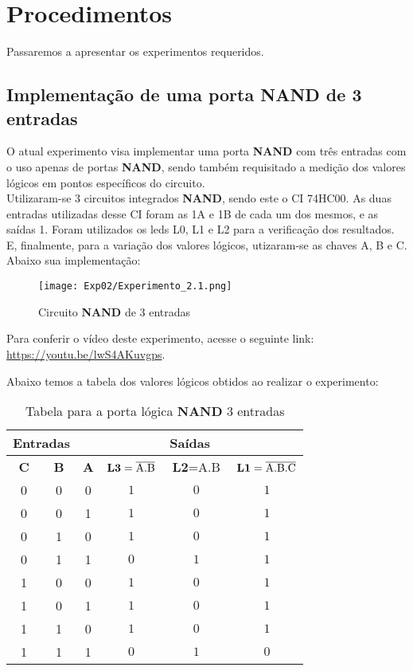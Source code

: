 \documentclass[12pt]{article}
\begin{document}
\section{Procedimentos}
\label{sec:Procedimentos}

Passaremos a apresentar os experimentos requeridos.

\subsection{Implementação de uma porta \textbf{NAND} de 3 entradas}
\label{sec:led_chave}

O atual experimento visa implementar uma porta \textbf{NAND} com três entradas com o uso apenas de portas \textbf{NAND}, sendo também requisitado a medição dos valores lógicos em pontos específicos do circuito.\\
Utilizaram-se 3 circuitos integrados \textbf{NAND}, sendo este o CI 74HC00. As duas entradas utilizadas desse CI foram as 1A e 1B de cada um dos mesmos, e as saídas 1. Foram utilizados os leds L0, L1 e L2 para a verificação dos resultados. E, finalmente, para a variação dos valores lógicos, utizaram-se as chaves A, B e C.\\

Abaixo sua implementação:
\begin{figure}[H]
    \centering
    \texttt{[image: Exp02/Experimento\_2.1.png]}
    \caption{Circuito \textbf{NAND} de 3 entradas}
    \label{fig:Esquema_Experimento2_2.3}
\end{figure}

Para conferir o vídeo deste experimento, acesse o seguinte link:
\href{https://youtu.be/lwS4AKuvgps}{https://youtu.be/lwS4AKuvgps}.

Abaixo temos a tabela dos valores lógicos obtidos ao realizar o experimento:

\begin{table}[H]
    \centering
    \caption{Tabela para a porta lógica \textbf{NAND} 3 entradas}
    \begin{tabular}{|c|c|c|c|c|c|}
     \hline
    \multicolumn{2}{|c|}{Entradas} & \multicolumn{4}{|c|}{Saídas} \\
    \hline
    \textbf{C} & \textbf{B} & \textbf{A} & $\textbf{L3}=\overline{\rm A.B}$ & $\textbf{L2}=\text{A.B}$ & $\textbf{L1}=\overline{\rm A.B.C}$ \\
    \hline
    0 & 0  & 0 & \(1\) & \(0\) & \(1\) \\
    \hline
    0 & 0  & 1 & \(1\) & \(0\) & \(1\) \\
    \hline
    0 & 1  & 0 & \(1\) & \(0\) & \(1\) \\
    \hline
    0 & 1  & 1 & \(0\) & \(1\) & \(1\) \\
    \hline
    1 & 0  & 0 & \(1\) & \(0\) & \(1\) \\
    \hline
    1 & 0  & 1 & \(1\) & \(0\) & \(1\) \\
    \hline
    1 & 1  & 0 & \(1\) & \(0\) & \(1\) \\
    \hline
    1 & 1  & 1 & \(0\) & \(1\) & \(0\) \\
    \hline
    \end{tabular}\label{tab:tabela_and}
\end{table}
\end{document}
